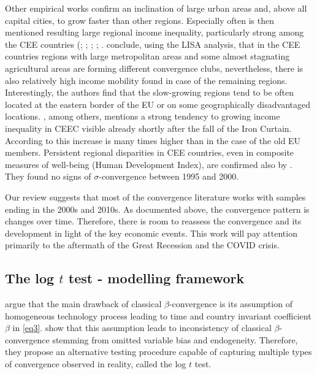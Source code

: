 \documentclass[11pt]{article}
\begin{document}
Other empirical works confirm an inclination of large urban areas and, above all capital cities, to grow faster than other regions. Especially often is then mentioned resulting large regional income inequality, particularly strong among the CEE countries (\citet{cuaresma2014determinants}; \citet{sme2012regional}; \citet{szendi2013convergence}; \citet{chapman2012income}; \citet{monastiriotis2011regional}. \citet{sme2012regional} conclude, using the LISA analysis, that in the CEE countries regions with large metropolitan areas and some almost stagnating agricultural areas are forming different convergence clubs, nevertheless, there is also relatively high income mobility found in case of the remaining regions. Interestingly, the authors find that the slow-growing regions tend to be often located at the eastern border of the EU or on some geographically disadvantaged locations. \citet{monastiriotis2011regional}, among others, mentions a strong tendency to growing income inequality in CEEC visible already shortly after the fall of the Iron Curtain. According to \citeauthor{monastiriotis2011regional} this increase is many times higher than in the case of the old EU members. Persistent regional disparities in CEE countries, even in composite measures of well-being (Human Development Index), are confirmed also by \citet{benedek2015paths}. They found no signs of $\sigma$-convergence between 1995 and 2000. 

Our review suggests that most of the convergence literature works with samples ending in the 2000s and 2010s. As documented above, the convergence pattern is changes over time. Therefore, there is room to reassess the convergence and its development in light of the key economic events. This work will pay attention primarily to the aftermath of the Great Recession and the COVID crisis.


\subsection{The log $t$ test - modelling framework}
\citet{phillips2007transition} argue that the main drawback of classical $\beta$-convergence is its assumption of homogeneous technology process leading to time and country invariant coefficient $\beta$ in \eqref{eq3}. \citet{phillips2007transition} show that this assumption leads to inconsistency of classical $\beta$-convergence stemming from omitted variable bias and endogeneity. Therefore, they propose an alternative testing procedure capable of capturing multiple types of convergence observed in reality, called the log $t$ test.
\end{document}
